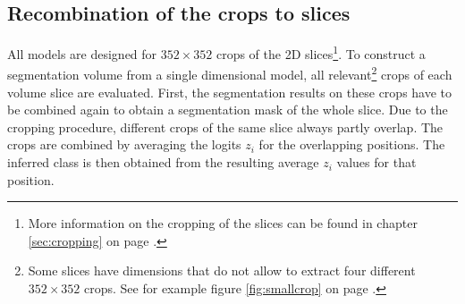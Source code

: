 \subsection{Recombination of the crops to slices}
All models are designed for $352 \times 352$ crops of the 2D slices\footnote{More information on the cropping of the slices can be found in chapter \ref{sec:cropping} on page \pageref{sec:cropping}.}.
To construct a segmentation volume from a single dimensional model, all relevant\footnote{Some slices have dimensions that do not allow to extract four different $352 \times 352$ crops. See for example figure \ref{fig:smallcrop} on page \pageref{fig:smallcrop}.} crops of each volume slice are evaluated.
First, the segmentation results on these crops have to be combined again to obtain a segmentation mask of the whole slice.
Due to the cropping procedure, different crops of the same slice always partly overlap.
The crops are combined by averaging the logits $z_i$ for the overlapping positions.
The inferred class is then obtained from the resulting average $z_i$ values for that position. 

